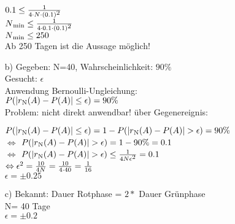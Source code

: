 \documentclass[a4paper]{article}
\begin{document}
\begin{description}
\begin{itemize}
											$0.1 \leq \frac{1}{4\cdot N\cdot (0.1)\textsuperscript{2}}$ \\
											
											$N\textsubscript{min} \leq \frac{1}{4\cdot 0.1\cdot (0.1)\textsuperscript{2}}$										\\
											
											$N\textsubscript{min} \leq 250$\\
											
											Ab 250 Tagen ist die Aussage möglich!\\
											
            \item[b)] Gegeben: N=40, Wahrscheinlichkeit: $90\%$ \\
					
											Gesucht: $\epsilon$\\
											
											Anwendung Bernoulli-Ungleichung:\\
											$P(\left|r\textsubscript{N}(A)-P(A)\right|\leq \epsilon)= 90\%$\\
											
											Problem: nicht direkt anwendbar!
											über Gegenereignis:
											
											$P(\left|r\textsubscript{N}(A)-P(A)\right|\leq \epsilon)=1-P(\left|r\textsubscript{N}(A)-P(A)\right|> \epsilon)=90\%$\\
											
											$\Leftrightarrow$ $P(\left|r\textsubscript{N}(A)-P(A)\right|> \epsilon)=1-90\% = 0.1$\\
											
											$\Leftrightarrow$ $P(\left|r\textsubscript{N}(A)-P(A)\right|> \epsilon) \leq \frac{1}{4N\epsilon\textsuperscript{2}} = 0.1$\\
											
											$\Leftrightarrow \epsilon\textsuperscript{2}= \frac{10}{4N}= \frac{10}{4\cdot40}=\frac{1}{16}$\\
											
											$\epsilon = \pm 0.25$\\
											
					  \item[c)]	Bekannt: Dauer Rotphase = $2 *$ Dauer Grünphase\\
											N= 40 Tage\\
											$\epsilon= \pm 0.2$\\
											

\end{itemize}
\end{description}
\end{document}

